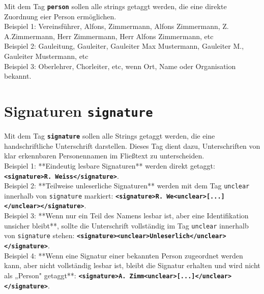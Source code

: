 \documentclass{article}
\begin{document}
Mit dem Tag \texttt{\texttt{\texttt{\textbf{{\colorbox{person}{person}}}}}} sollen alle strings getaggt werden, die eine direkte Zuordnung eier Person ermöglichen. \\

\noindent{} Beispiel 1: Vereinsführer, Alfons, Zimmermann, Alfons Zimmermann, Z. A.Zimmermann, Herr Zimmermann, Herr Alfons Zimmermann, etc \\
 Beispiel 2: Gauleitung, Gauleiter, Gauleiter Max Mustermann, Gauleiter M., Gauleiter Mustermann, etc\\
 Beispiel 3: Oberlehrer, Chorleiter, etc, wenn Ort, Name oder Organisation bekannt. \\

\section*{Signaturen \texttt{\texttt{\textbf{{\colorbox{signature}{signature}}}}}}

Mit dem Tag \texttt{\texttt{\texttt{\textbf{{\colorbox{signature}{signature}}}}}} sollen alle Strings getaggt werden, die eine handschriftliche Unterschrift darstellen. Dieses Tag dient dazu, Unterschriften von klar erkennbaren Personennamen im Fließtext zu unterscheiden. \\

\noindent{} Beispiel 1: **Eindeutig lesbare Signaturen** werden direkt getaggt:  
\texttt{\textbf{\textless signature\textgreater R. Weiss\textless /signature\textgreater}}.\\  

 Beispiel 2: **Teilweise unleserliche Signaturen** werden mit dem Tag \texttt{unclear} innerhalb von \texttt{signature} markiert:  
\texttt{\textbf{\textless signature\textgreater R. We\textless unclear\textgreater [...]\textless /unclear\textgreater\textless /signature\textgreater}}.\\  

 Beispiel 3: **Wenn nur ein Teil des Namens lesbar ist, aber eine Identifikation unsicher bleibt**, sollte die Unterschrift vollständig im Tag \texttt{unclear} innerhalb von \texttt{signature} stehen:  
\texttt{\textbf{\textless signature\textgreater \textless unclear\textgreater Unleserlich\textless /unclear\textgreater \textless /signature\textgreater}}.\\  

 Beispiel 4: **Wenn eine Signatur einer bekannten Person zugeordnet werden kann, aber nicht vollständig lesbar ist, bleibt die Signatur erhalten und wird nicht als „Person" getaggt**:  
\texttt{\textbf{\textless signature\textgreater A. Zimm\textless unclear\textgreater [...]\textless /unclear\textgreater\textless /signature\textgreater}}.\\  
\end{document}
